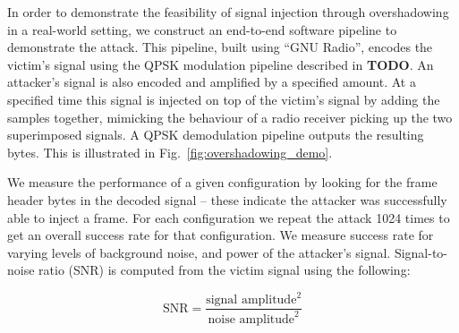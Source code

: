 In order to demonstrate the feasibility of signal injection through overshadowing in a real-world setting, we construct an end-to-end software pipeline to demonstrate the attack.
This pipeline, built using ``GNU Radio'', encodes the victim's signal using the QPSK modulation pipeline described in \textbf{TODO}.
An attacker's signal is also encoded and amplified by a specified amount.
At a specified time this signal is injected on top of the victim's signal by adding the samples together, mimicking the behaviour of a radio receiver picking up the two superimposed signals.
A QPSK demodulation pipeline outputs the resulting bytes.
This is illustrated in Fig.~\ref{fig:overshadowing_demo}.

We measure the performance of a given configuration by looking for the frame header bytes in the decoded signal -- these indicate the attacker was successfully able to inject a frame.
For each configuration we repeat the attack 1024 times to get an overall success rate for that configuration.
We measure success rate for varying levels of background noise, and power of the attacker's signal.
Signal-to-noise ratio (SNR) is computed from the victim signal using the following:

\begin{equation}
\label{eq:snr}
    \text{SNR} = \frac{\text{signal amplitude}^2}{\text{noise amplitude}^2}
\end{equation}

